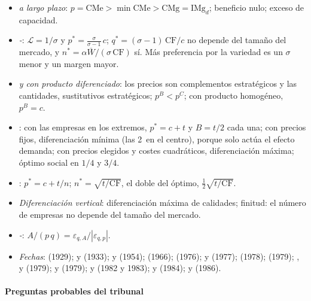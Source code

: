 \documentclass[11pt]{article}
\begin{document}
\begin{itemize}
\item \emph{ a largo plazo}: $p=\mathrm{CMe}>\min\mathrm{CMe}>\mathrm{CMg}=\mathrm{IMg}_d$; beneficio nulo; exceso de capacidad.
\item \emph{-}: $\mathcal{L}=1/\sigma$ y $p^*=\frac{\sigma}{\sigma-1}\,c$; $q^*=(\sigma-1)\,\mathrm{CF}/c$ no depende del tamaño del mercado, y $n^*=\alpha\overline{W}/(\sigma\,\mathrm{CF})$ sí. Más preferencia por la variedad es un $\sigma$ menor y un margen mayor.
\item \emph{ y  con producto diferenciado}: los precios son complementos estratégicos y las cantidades, sustitutivos estratégicos; $p^B<p^C$; con producto homogéneo, $p^B=c$.
\item \emph{}: con las empresas en los extremos, $p^*=c+t$ y $B=t/2$ cada una; con precios fijos, diferenciación mínima (las 2~en el centro), porque solo actúa el efecto demanda; con precios elegidos y costes cuadráticos, diferenciación máxima; óptimo social en $1/4$ y $3/4$.
\item \emph{}: $p^*=c+t/n$; $n^*=\sqrt{t/\mathrm{CF}}$, el doble del óptimo, $\frac{1}{2}\sqrt{t/\mathrm{CF}}$.
\item \emph{Diferenciación vertical}: diferenciación máxima de calidades; finitud: el número de empresas no depende del tamaño del mercado.
\item \emph{-}: $A/(p\,q)=\varepsilon_{q,A}/|\varepsilon_{q,p}|$.
\item \emph{Fechas}:  (1929);  y  (1933);  y  (1954);  (1966);  (1976);  y  (1977);  (1978);  (1979); ,  y  (1979);  y  (1979);  y  (1982 y 1983);  y  (1984);  y  (1986).
\end{itemize}

\paragraph{Preguntas probables del tribunal}
\end{document}
